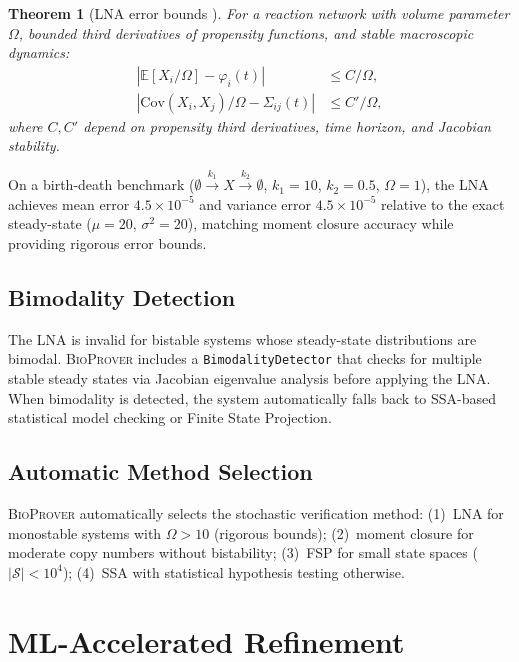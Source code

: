 \documentclass[11pt]{article}
\newtheorem{theorem}{Theorem}
\newcommand{\bioprover}{\textsc{BioProver}}
\begin{document}
\begin{theorem}[LNA error bounds {\cite[Thm.~3.1]{kurtz1972relationship}}]
\label{thm:lna}
For a reaction network with volume parameter $\Omega$, bounded third
derivatives of propensity functions, and stable macroscopic dynamics:
\begin{align}
|\mathbb{E}[X_i/\Omega] - \varphi_i(t)| &\leq C/\Omega, \\
|\text{Cov}(X_i, X_j)/\Omega - \Sigma_{ij}(t)| &\leq C'/\Omega,
\end{align}
where $C, C'$ depend on propensity third derivatives, time horizon,
and Jacobian stability.
\end{theorem}

On a birth-death benchmark ($\emptyset \xrightarrow{k_1} X
\xrightarrow{k_2} \emptyset$, $k_1=10$, $k_2=0.5$, $\Omega=1$),
the LNA achieves mean error $4.5 \times 10^{-5}$ and variance
error $4.5 \times 10^{-5}$ relative to the exact steady-state
($\mu=20$, $\sigma^2=20$), matching moment closure accuracy while
providing rigorous error bounds.

\subsection{Bimodality Detection}

The LNA is invalid for bistable systems whose steady-state
distributions are bimodal. \bioprover{} includes a
\texttt{BimodalityDetector} that checks for multiple stable steady
states via Jacobian eigenvalue analysis before applying the LNA.
When bimodality is detected, the system automatically falls back to
SSA-based statistical model checking or Finite State Projection.

\subsection{Automatic Method Selection}

\bioprover{} automatically selects the stochastic verification
method: (1)~LNA for monostable systems with $\Omega > 10$ (rigorous
bounds); (2)~moment closure for moderate copy numbers without
bistability; (3)~FSP for small state spaces ($|\mathcal{S}| < 10^4$);
(4)~SSA with statistical hypothesis testing otherwise.

\section{ML-Accelerated Refinement}
\label{sec:ml}
\end{document}
